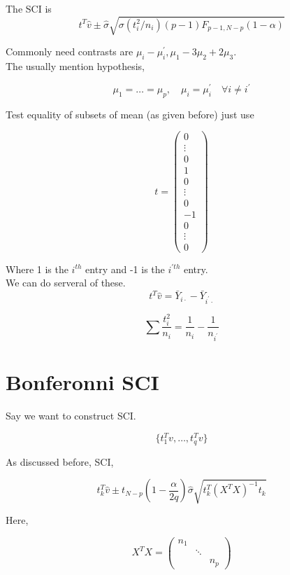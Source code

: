 \documentclass[11pt,fleqn]{book} %
\begin{document}
The SCI is 
		$$t^T \hat{v}  \pm \hat{\sigma} \sqrt{\sigma(t_i^2/n_i) (p-1) F_{p-1, N-p} (1 - \alpha)} $$

Commonly need contrasts are $\mu_i - \mu_i^\prime, \mu_1 - 3 \mu_2 + 2\mu_3 $.\\

The usually mention hypothesis, 

		$$\mu_1 = \dots = \mu_p, \quad \mu_i = \mu_i^\prime \quad \forall i \neq i^\prime $$


Test equality of subsets of mean (as given before) just use 

		$$t = \begin{pmatrix}
			0\\
			\vdots\\
			0\\
			1\\
			0\\
			\vdots\\
			0\\
			-1\\
			0\\
			\vdots\\
			0
		\end{pmatrix} $$

Where 1 is the $i^{th}$ entry and -1 is the $i^{\prime th}$ entry.\\

We can do serveral of these.\\

		$$t^T \hat{v} = \bar{Y}_{i \cdot} - \bar{Y}_{i^\prime \cdot} $$

		$$\sum \frac{t_i^2}{n_i} = \frac{1}{n_i} - \frac{1}{n_{i^\prime}} $$

\section{Bonferonni SCI}

Say we want to construct SCI. 

		$$\{t_1^T v, \dots, t^T_q v \} $$ 

As discussed before, SCI, 

		$$ t_k^T \hat{v} \pm t_{N-p} \left(1 - \frac{\alpha}{2q}\right) \hat{\sigma} \sqrt{t_k^T (X^TX)^{-1}t_k} $$

Here, 

		$$X^TX = \begin{pmatrix}
			n_1 & & \\
			 & \ddots & \\
			 & & n_p 
		\end{pmatrix} $$
\end{document}
